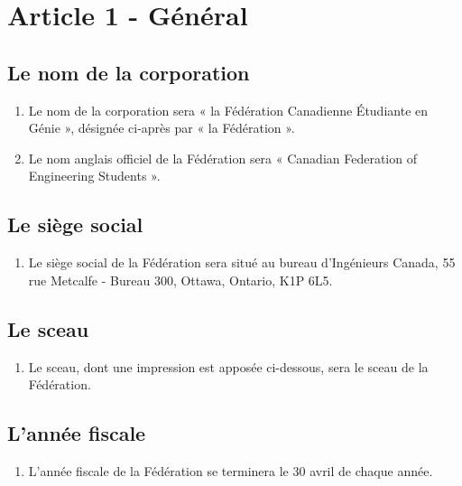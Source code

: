 \section{Article 1 - Général}
\label{article-1-general}

\subsection{Le nom de la corporation}
\label{le-nom-de-la-corporation}

\begin{enumerate}
 \item
  Le nom de la corporation sera « la Fédération Canadienne Étudiante en Génie », désignée ci-après par « la Fédération ».
 \item
  Le nom anglais officiel de la Fédération sera « Canadian Federation of Engineering Students ».
\end{enumerate}

\subsection{Le siège social}
\label{le-siege-social}

\begin{enumerate}
 \item
  Le siège social de la Fédération sera situé au bureau d'Ingénieurs Canada, 55 rue Metcalfe - Bureau 300, Ottawa, Ontario, K1P 6L5.
\end{enumerate}

\subsection{Le sceau}
\label{le-sceau}

\begin{enumerate}
 \item
  Le sceau, dont une impression est apposée ci-dessous, sera le sceau de la Fédération.
\end{enumerate}

\subsection{L'année fiscale}
\label{l-annee-fiscale}

\begin{enumerate}
 \item
  L'année fiscale de la Fédération se terminera le 30 avril de chaque année.
\end{enumerate}

